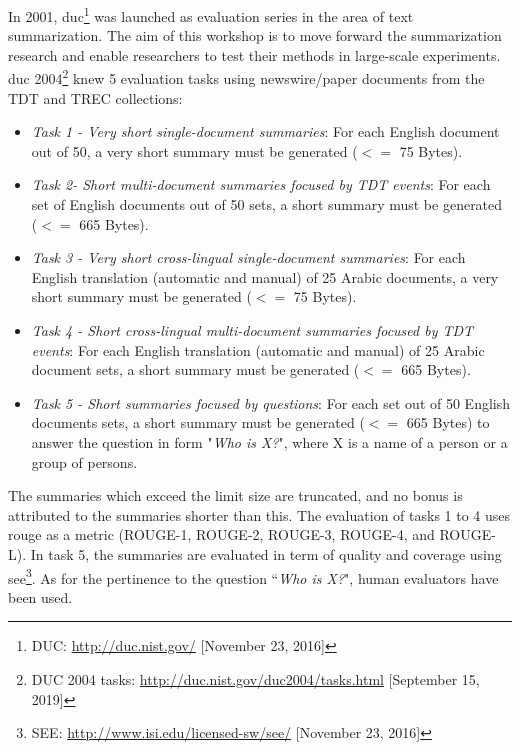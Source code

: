 In 2001, \acf{duc}\footnote{DUC: \url{http://duc.nist.gov/} [November 23, 2016]} was launched as evaluation series in the area of text summarization. 
The aim of this workshop is to move forward the summarization research and enable researchers to test their methods in large-scale experiments. \ac{duc} 2004\footnote{DUC 2004 tasks: \url{http://duc.nist.gov/duc2004/tasks.html} [September 15, 2019]} knew 5 evaluation tasks using newswire/paper documents from the TDT and TREC collections:
\begin{itemize}
	\item \textit{Task 1 - Very short single-document summaries}: 
	For each English document out of 50, a very short summary must be generated ($ <= $ 75 Bytes).
	
	\item \textit{Task 2- Short multi-document summaries focused by TDT events}: 
	For each set of English documents out of 50 sets, a short summary must be generated ($ <= $ 665 Bytes).
	
	\item \textit{Task 3 - Very short cross-lingual single-document summaries}: 
	For each English translation (automatic and manual) of 25 Arabic documents, a very short summary must be generated ($ <= $ 75 Bytes).
	
	\item \textit{Task 4 - Short cross-lingual multi-document summaries focused by TDT events}: 
	For each English translation (automatic and manual) of 25 Arabic document sets, a short summary must be generated ($ <= $ 665 Bytes).
	
	\item \textit{Task 5 - Short summaries focused by questions}: 
	For each set out of 50 English documents sets, a short summary must be generated ($ <= $ 665 Bytes) to answer the question in form "\textit{Who is X?}", where X is a name of a person or a group of persons.
\end{itemize}
The summaries which exceed the limit size are truncated, and no bonus is attributed to the summaries shorter than this.
The evaluation of tasks 1 to 4 uses \ac{rouge} as a metric (ROUGE-1, ROUGE-2, ROUGE-3, ROUGE-4, and ROUGE-L).
In task 5, the summaries are evaluated in term of quality and coverage using \ac{see}\footnote{SEE: \url{http://www.isi.edu/licensed-sw/see/} [November 23, 2016]}.
As for the pertinence to the question ``\textit{Who is X?}", human evaluators have been used.

